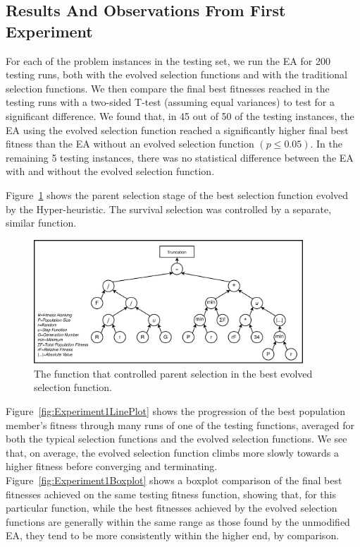 \documentclass[times,12pt,titlepage]{mstogs}
\begin{document}
\begin{ThesisBody}
\section{Results And Observations From First Experiment}
\label{firstExperimentResults}

For each of the problem instances in the testing set, we run the EA for 200 testing runs, both with the evolved selection functions and with the traditional selection functions. We then compare the final best fitnesses reached in the testing runs with a two-sided T-test (assuming equal variances) to test for a significant difference. We found that, in 45 out of 50 of the testing instances, the EA using the evolved selection function reached a significantly higher final best fitness than the EA without an evolved selection function $(p \leq 0.05)$. In the remaining 5 testing instances, there was no statistical difference between the EA with and without the evolved selection function.

Figure~\ref{fig:experiment1Result} shows the parent selection stage of the best selection function evolved by the Hyper-heuristic. The survival selection was controlled by a separate, similar function.

\begin{figure}
    \centering
    \includegraphics[width=0.9\textwidth]{experiment1Result}
    \caption{The function that controlled parent selection in the best evolved selection function.}
    \label{fig:experiment1Result}
\end{figure}

Figure~\ref{fig:Experiment1LinePlot} shows the progression of the best population member's fitness through many runs of one of the testing functions, averaged for both the typical selection functions and the evolved selection functions. We see that, on average, the evolved selection function climbs more slowly towards a higher fitness before converging and terminating. Figure~\ref{fig:Experiment1Boxplot} shows a boxplot comparison of the final best fitnesses achieved on the same testing fitness function, showing that, for this particular function, while the best fitnesses achieved by the evolved selection functions are generally within the same range as those found by the unmodified EA, they tend to be more consistently within the higher end, by comparison.


\end{ThesisBody}
\end{document}
